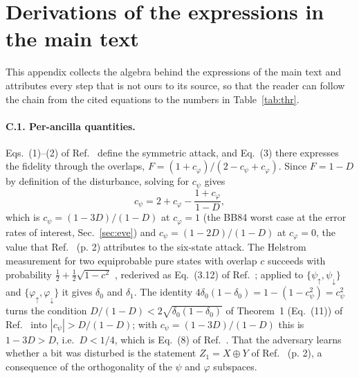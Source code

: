 \documentclass[aps,pra,twocolumn,superscriptaddress,nofootinbib]{revtex4-2}
\begin{document}
\section{Derivations of the expressions in the main text}\label{app:C}
This appendix collects the algebra behind the expressions of the main text and attributes every step that is not ours to its source, so that the reader can follow the chain from the cited equations to the numbers in Table~\ref{tab:thr}.

\paragraph*{C.1. Per-ancilla quantities.} Eqs.~(1)--(2) of Ref.~\cite{GW99} define the symmetric attack, and Eq.~(3) there expresses the fidelity through the overlaps, $F=(1+c_\varphi)/(2-c_\psi+c_\varphi)$. Since $F=1-D$ by definition of the disturbance, solving for $c_\psi$ gives
$$c_\psi=2+c_\varphi-\frac{1+c_\varphi}{1-D},$$
which is $c_\psi=(1-3D)/(1-D)$ at $c_\varphi=1$ (the BB84 worst case at the error rates of interest, Sec.~\ref{sec:eve}) and $c_\psi=(1-2D)/(1-D)$ at $c_\varphi=0$, the value that Ref.~\cite{GW99} (p. 2) attributes to the six-state attack. The Helstrom measurement for two equiprobable pure states with overlap $c$ succeeds with probability $\tfrac12+\tfrac12\sqrt{1-c^2}$ \cite{Hel76}, rederived as Eq.~(3.12) of Ref.~\cite{Fuchs96}; applied to $\{\psi_\uparrow,\psi_\downarrow\}$ and $\{\varphi_\uparrow,\varphi_\downarrow\}$ it gives $\delta_0$ and $\delta_1$. The identity $4\delta_0(1-\delta_0)=1-(1-c_\psi^2)=c_\psi^2$ turns the condition $D/(1-D)<2\sqrt{\delta_0(1-\delta_0)}$ of Theorem~1 (Eq.~(11)) of Ref.~\cite{GW99} into $|c_\psi|>D/(1-D)$; with $c_\psi=(1-3D)/(1-D)$ this is $1-3D>D$, i.e.\ $D<1/4$, which is Eq.~(8) of Ref.~\cite{GW99}. That the adversary learns whether a bit was disturbed is the statement $Z_1=X\oplus Y$ of Ref.~\cite{GW99} (p. 2), a consequence of the orthogonality of the $\psi$ and $\varphi$ subspaces.
\end{document}
